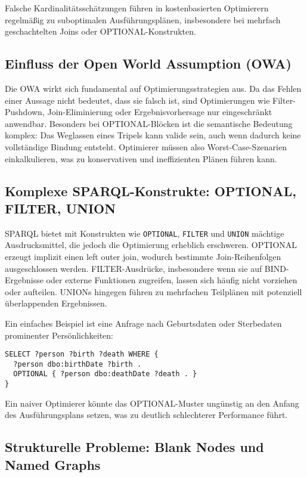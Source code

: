 \documentclass[12pt]{article}
\begin{document}
Falsche Kardinalitätsschätzungen führen in kostenbasierten Optimierern regelmäßig zu suboptimalen Ausführungsplänen, insbesondere bei mehrfach geschachtelten Joins oder OPTIONAL-Konstrukten.

\subsection{Einfluss der Open World Assumption (OWA)}

Die OWA wirkt sich fundamental auf Optimierungsstrategien aus. Da das Fehlen einer Aussage nicht bedeutet, dass sie falsch ist, sind Optimierungen wie Filter-Pushdown, Join-Eliminierung oder Ergebnisvorhersage nur eingeschränkt anwendbar. Besonders bei OPTIONAL-Blöcken ist die semantische Bedeutung komplex: Das Weglassen eines Tripels kann valide sein, auch wenn dadurch keine vollständige Bindung entsteht. Optimierer müssen also Worst-Case-Szenarien einkalkulieren, was zu konservativen und ineffizienten Plänen führen kann.

\subsection{Komplexe SPARQL-Konstrukte: OPTIONAL, FILTER, UNION}

SPARQL bietet mit Konstrukten wie \texttt{OPTIONAL}, \texttt{FILTER} und \texttt{UNION} mächtige Ausdrucksmittel, die jedoch die Optimierung erheblich erschweren. OPTIONAL erzeugt implizit einen left outer join, wodurch bestimmte Join-Reihenfolgen ausgeschlossen werden. FILTER-Ausdrücke, insbesondere wenn sie auf BIND-Ergebnisse oder externe Funktionen zugreifen, lassen sich häufig nicht vorziehen oder aufteilen. UNIONs hingegen führen zu mehrfachen Teilplänen mit potenziell überlappenden Ergebnissen.

Ein einfaches Beispiel ist eine Anfrage nach Geburtsdaten oder Sterbedaten prominenter Persönlichkeiten:

\begin{lstlisting}[caption=Beispiel: OPTIONAL-Abfrage in SPARQL]
SELECT ?person ?birth ?death WHERE {
  ?person dbo:birthDate ?birth .
  OPTIONAL { ?person dbo:deathDate ?death . }
}
\end{lstlisting}

Ein naiver Optimierer könnte das OPTIONAL-Muster ungünstig an den Anfang des Ausführungsplans setzen, was zu deutlich schlechterer Performance führt.

\subsection{Strukturelle Probleme: Blank Nodes und Named Graphs}
\end{document}
